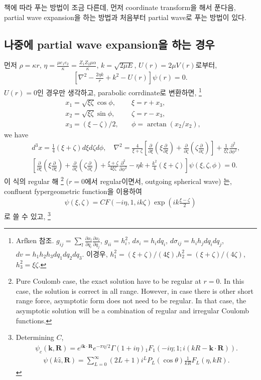 \documentclass[10pt]{article}
\def\bm{\boldsymbol}
\newcommand{\bea}{\begin{eqnarray}}
\newcommand{\eea}{\end{eqnarray}}
\newcommand{\no}{\nonumber \\}
\newcommand{\del}{\partial}
\def\vk{{\bm k}}
\begin{document}
책에 따라 푸는 방법이 조금 다른데, 
먼저 coordinate transform을 해서 푼다음, 
partial wave expansion을 하는 방법과
처음부터 partial wave로 푸는 방법이 있다.

\subsection{나중에 partial wave expansion을 하는 경우}
먼저 $\rho=\kappa r$, 
$\eta=\frac{\mu e_1 e_2}{\kappa}=\frac{Z_1 Z_2 \mu\alpha}{\kappa}$,
$k=\sqrt{2\mu E}$, $U(r)=2\mu V(r)$로부터,
\bea
\left[\nabla^2-\frac{2\eta k}{r}+k^2-U(r)\right] \psi(r)=0.
\eea
$U(r)=0$인 경우만 생각하고, parabolic corrdinate로 변환하면,
\footnote{ Arfken 참조. 
$g_{ij}=\sum_l \frac{\del x_l}{\del q_i}\frac{\del x_l}{\del q_j}$,
$g_{ii}=h_i^2$, $ds_i=h_i dq_i$, 
$d\sigma_{ij}=h_i h_j dq_i dq_j$,
$dv=h_1 h_2 h_3 dq_1dq_2dq_3$. 이경우,
$h_1^2=(\xi+\zeta)/(4\xi)$,$h_2^2=(\xi+\zeta)/(4\zeta)$,
$h_3^2=\xi\zeta$.
}
\bea
&x_1=\sqrt{\xi\zeta}\cos\phi,\quad &\xi=r+x_3,\no
&x_2=\sqrt{\xi\zeta}\sin\phi,\quad &\zeta= r-x_3,\no
&x_3=(\xi-\zeta)/2,\quad &\phi= \arctan(x_2/x_2),
\eea
we have
\bea
& &d^3 x=\frac{1}{4}(\xi+\zeta)d\xi d\zeta d\phi, \quad
\nabla^2=\frac{4}{\xi+\zeta}\left[ \frac{\del}{\del\xi}(\xi\frac{\del}{\del\xi})
+\frac{\del}{\del \zeta}(\zeta\frac{\del}{\del\zeta})
\right]+\frac{1}{\xi\zeta}\frac{\del^2}{\del\phi^2},\no
& &\left[
\frac{\del}{\del\xi}(\xi\frac{\del}{\del\xi})
+\frac{\del}{\del \zeta}(\zeta\frac{\del}{\del\zeta})
+\frac{\xi+\zeta}{4\xi\zeta}\frac{\del^2}{\del\phi^2}
-\eta k+\frac{k^2}{4}(\xi+\zeta)
\right]\psi(\xi,\zeta,\phi)=0.
\eea
이 식의 regular 해
\footnote{
Pure Coulomb case, the exact solution have to be regular
at $r=0$. In this case, the solution is correct in all range.
However, in case there is other
short range force, 
asymptotic form does not need to be regular.
In that case, the asymptotic solution will be a combination of
regular and irregular Coulomb functions.
}
($r=0$에서 regular이면서, 
outgoing spherical wave)
는, confluent fypergeometric function을 이용하여
\bea
\psi(\xi,\zeta)=C F(-i\eta,1, ik\zeta) \exp(ik\frac{\xi-\zeta}{2})
\eea
로 쓸 수 있고,
\footnote{
Determining $C$,
\bea
\psi_c({\bm k},{\bm R})
=e^{i\vk\cdot{\bm R}}e^{-\pi\eta/2}\Gamma(1+i\eta)
 {}_1F_1(-i\eta;1;i(kR-{\bm k}\cdot{\bm R})).
\eea
\bea
\psi(k\hat{z},{\bm R})
=\sum_{L=0}^\infty (2L+1)i^L P_L(\cos\theta) \frac{1}{kR}
  F_L(\eta,kR).
\eea
}
\end{document}
